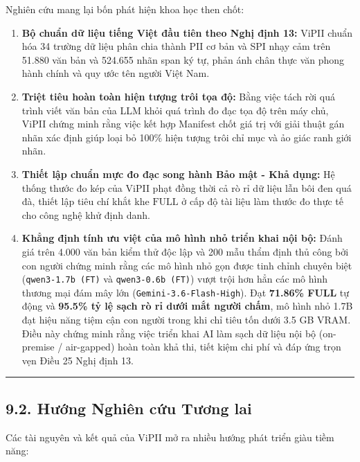 \documentclass[
  11pt,
  a4paper,
]{article}
\providecommand{\tightlist}{%
  \setlength{\itemsep}{0pt}\setlength{\parskip}{0pt}}
\begin{document}
Nghiên cứu mang lại bốn phát hiện khoa học then chốt:

\begin{enumerate}
\def\labelenumi{\arabic{enumi}.}
\tightlist
\item
  \textbf{Bộ chuẩn dữ liệu tiếng Việt đầu tiên theo Nghị định 13:} ViPII chuẩn hóa 34 trường dữ liệu
  phân chia thành PII cơ bản và SPI nhạy cảm trên 51.880 văn bản và 524.655 nhãn span ký tự, phản
  ánh chân thực văn phong hành chính và quy ước tên người Việt Nam.
\item
  \textbf{Triệt tiêu hoàn toàn hiện tượng trôi tọa độ:} Bằng việc tách rời quá trình viết văn bản
  của LLM khỏi quá trình đo đạc tọa độ trên máy chủ, ViPII chứng minh rằng việc kết hợp Manifest
  chốt giá trị với giải thuật gán nhãn xác định giúp loại bỏ 100\% hiện tượng trôi chỉ mục và ảo
  giác ranh giới nhãn.
\item
  \textbf{Thiết lập chuẩn mực đo đạc song hành Bảo mật - Khả dụng:} Hệ thống thước đo kép của ViPII
  phạt đồng thời cả rò rỉ dữ liệu lẫn bôi đen quá đà, thiết lập tiêu chí khắt khe \(\text{FULL}\) ở
  cấp độ tài liệu làm thước đo thực tế cho công nghệ khử định danh.
\item
  \textbf{Khẳng định tính ưu việt của mô hình nhỏ triển khai nội bộ:} Đánh giá trên 4.000 văn bản
  kiểm thử độc lập và 200 mẫu thẩm định thủ công bởi con người chứng minh rằng các mô hình nhỏ gọn
  được tinh chỉnh chuyên biệt (\texttt{qwen3-1.7b\ (FT)} và \texttt{qwen3-0.6b\ (FT)}) vượt trội hơn
  hẳn các mô hình thương mại đám mây lớn (\texttt{Gemini-3.6-Flash-High}). Đạt \textbf{71.86\% FULL}
  tự động và \textbf{95.5\% tỷ lệ sạch rò rỉ dưới mắt người chấm}, mô hình nhỏ 1.7B đạt hiệu năng
  tiệm cận con người trong khi chỉ tiêu tốn dưới 3.5 GB VRAM. Điều này chứng minh rằng việc triển
  khai AI làm sạch dữ liệu nội bộ (on-premise / air-gapped) hoàn toàn khả thi, tiết kiệm chi phí và
  đáp ứng trọn vẹn Điều 25 Nghị định 13.
\end{enumerate}

\begin{center}\rule{0.5\linewidth}{0.5pt}\end{center}

\subsection{9.2. Hướng Nghiên cứu Tương
lai}\label{hux1b0ux1edbng-nghiuxean-cux1ee9u-tux1b0ux1a1ng-lai}

Các tài nguyên và kết quả của ViPII mở ra nhiều hướng phát triển giàu tiềm năng:
\end{document}
